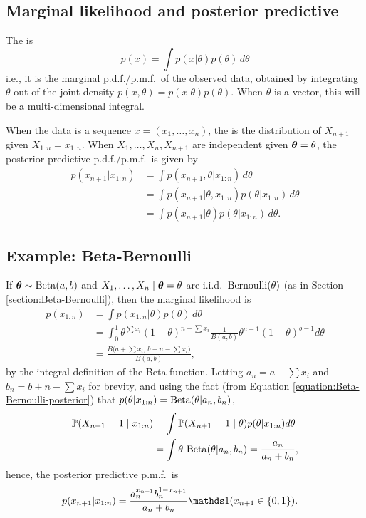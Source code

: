 \documentclass[12pt]{article}
\begin{document}
\subsection{Marginal likelihood and posterior predictive}

The  is 
$$ p(x) = \int p(x|\theta) p(\theta) \,d\theta $$
i.e., it is the marginal p.d.f./p.m.f.\ of the observed data, obtained by integrating $\theta$ out of the joint density $p(x,\theta) = p(x|\theta) p(\theta)$. When $\theta$ is a vector, this will be a multi-dimensional integral.

When the data is a sequence $x =(x_1,\dotsc,x_n)$, the  is the distribution of $X_{n+1}$ given $X_{1:n}= x_{1:n}$.  When $X_1,\dotsc,X_n,X_{n+1}$ are independent given ${\bm\theta} =\theta$, the posterior predictive p.d.f./p.m.f.\ is given by
\begin{align*}
p(x_{n+1}|x_{1:n}) &= \int p(x_{n+1},\theta|x_{1:n})\,d\theta\\
&= \int p(x_{n+1}|\theta,x_{1:n}) p(\theta|x_{1:n})\,d\theta\\
& = \int p(x_{n+1}|\theta) p(\theta|x_{1:n})\,d\theta.
\end{align*}

\subsection{Example: Beta-Bernoulli}

If ${\bm\theta}\sim\operatorname*{Beta}(a,b)$ and $X_1,\dotsc,X_n\mid {\bm\theta} =\theta$ are i.i.d.\ $\operatorname*{Bernoulli}(\theta)$ (as in Section \ref{section:Beta-Bernoulli}), then the marginal likelihood is
\begin{align*}
p(x_{1:n}) &= \int p(x_{1:n}|\theta) p(\theta) \,d\theta\\
& = \int_0^1\theta^{\sum x_i}(1-\theta)^{n-\sum x_i}\frac{1}{B(a,b)}\theta^{a-1}(1-\theta)^{b-1} d\theta\\
& =\frac{B\big(a +\sum x_i,\, b + n-\sum x_i\big)}{B(a,b)},
\end{align*}
by the integral definition of the Beta function.
Letting $a_n = a +\sum x_i$ and $b_n = b + n-\sum x_i$ for brevity, and using the fact (from Equation \ref{equation:Beta-Bernoulli-posterior}) that $p(\theta|x_{1:n}) = \operatorname*{Beta}(\theta|a_n,b_n)$,
\begin{align*}
\mathbb{P}(X_{n+1} = 1\mid x_{1:n}) & = \int \mathbb{P}(X_{n+1} = 1\mid \theta) p(\theta|x_{1:n}) d\theta\\
& =\int \theta\,\operatorname*{Beta}(\theta|a_n,b_n) =\frac{a_n}{a_n + b_n},
\end{align*}
hence, the posterior predictive p.m.f.\ is
\begin{align*}
p(x_{n+1}|x_{1:n}) & = \frac{a_n^{x_{n+1}} b_n^{1-x_{n+1}}}{a_n + b_n}\I(x_{n+1}\in\{0,1\}).
\end{align*}
\end{document}
